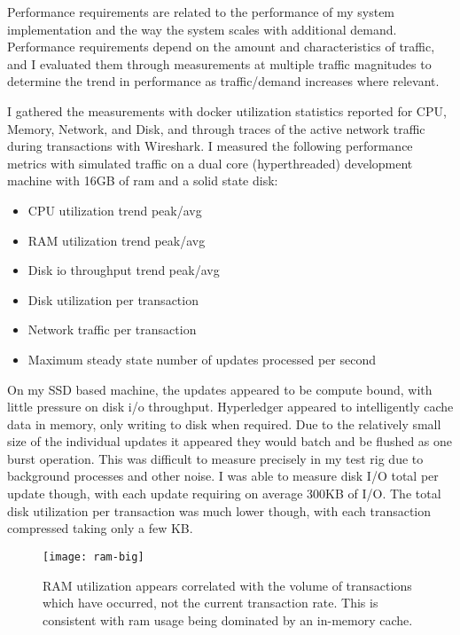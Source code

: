 Performance requirements are related to the performance of my system
implementation and the way the system scales with additional
demand. Performance requirements depend on the amount and
characteristics of traffic, and I evaluated them through measurements
at multiple traffic magnitudes to determine the trend in performance
as traffic/demand increases where relevant.

I gathered the measurements with docker utilization statistics
reported for CPU, Memory, Network, and Disk, and through traces of the
active network traffic during transactions with Wireshark. I measured
the following performance metrics with simulated traffic on a dual
core (hyperthreaded) development machine with 16GB of ram and a solid
state disk:
\begin{itemize}
\item CPU utilization trend peak/avg
\item RAM utilization trend peak/avg
\item Disk io throughput trend peak/avg
\item Disk utilization per transaction
\item Network traffic per transaction
\item Maximum steady state number of updates processed per second
\end{itemize}

On my SSD based machine, the updates appeared to be compute bound,
with little pressure on disk i/o throughput. Hyperledger appeared to
intelligently cache data in memory, only writing to disk when
required. Due to the relatively small size of the individual updates
it appeared they would batch and be flushed as one burst
operation. This was difficult to measure precisely in my test rig due
to background processes and other noise. I was able to measure disk
I/O total per update though, with each update requiring on average
300KB of I/O. The total disk utilization per transaction was much
lower though, with each transaction compressed taking only a few KB.

\begin{figure}[t] 
  \texttt{[image: ram-big]}
  \vspace{-4em}
  \caption{RAM utilization appears correlated with the volume of
    transactions which have occurred, not the current transaction
    rate. This is consistent with ram usage being dominated by an
    in-memory cache.}
  \label{ram}
\end{figure}

